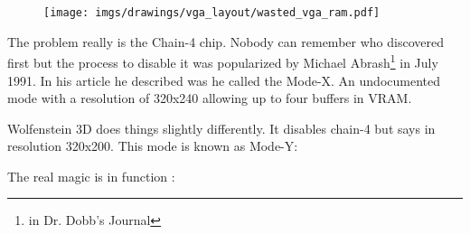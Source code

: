 \documentclass[book.tex]{subfiles}
\begin{document}
\begin{figure}[H]
\centering
 \texttt{[image: imgs/drawings/vga\_layout/wasted\_vga\_ram.pdf]}
 \end{figure}

 \par
 The problem really is the Chain-4 chip. Nobody can remember who discovered first but the process to disable it was popularized by Michael Abrash\footnote{in Dr. Dobb's Journal} in July 1991. In his article he described was he called the Mode-X. An undocumented mode with a resolution of 320x240 allowing up to four buffers in VRAM.\\
 \par
 Wolfenstein 3D does things slightly differently. It disables chain-4 but says in resolution 320x200. This mode is known as Mode-Y:\\
 \par
  \begin{minipage}{\textwidth}

\end{minipage}
 \par

The real magic is in function :\\
\end{document}
